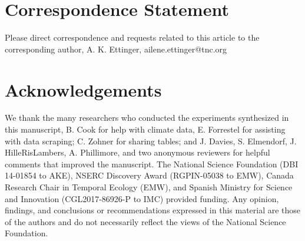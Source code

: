 \documentclass{article}
\begin{document}



\section*{Correspondence Statement}
Please direct correspondence and requests related to this article to the corresponding author, A. K. Ettinger, ailene.ettinger@tnc.org

\section*{Acknowledgements}
We thank the many researchers who conducted the experiments synthesized in this manuscript, B. Cook for help with climate data, E. Forrestel for assisting with data scraping; C. Zohner for sharing tables; and J. Davies, S. Elmendorf, J. HilleRisLambers, A. Phillimore, and two anonymous reviewers for helpful comments that improved the manuscript. The National Science Foundation (DBI 14-01854 to AKE), NSERC Discovery Award (RGPIN-05038 to EMW), Canada Research Chair in Temporal Ecology (EMW), and Spanish Ministry for Science and Innovation (CGL2017-86926-P to IMC) provided funding. Any opinion, findings, and conclusions or recommendations expressed in this material are those of the authors and do not necessarily reflect the views of the National Science Foundation.
\end{document}
